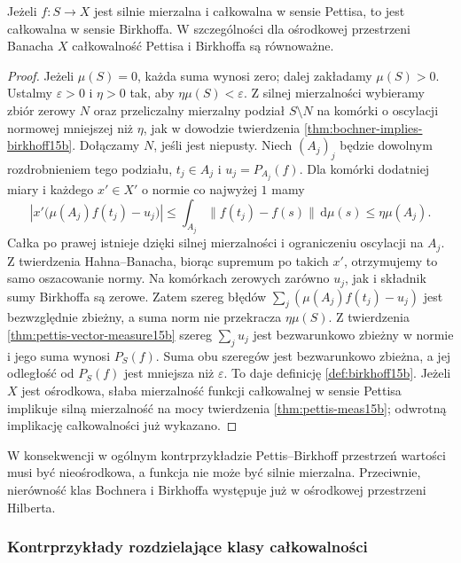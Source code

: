 \begin{wniosek}
\label{cor:birkhoff-strong-pettis15b}
Jeżeli $f:S\to X$ jest silnie mierzalna
i całkowalna w sensie Pettisa, to jest całkowalna
w sensie Birkhoffa. W szczególności dla ośrodkowej
przestrzeni Banacha $X$ całkowalność Pettisa
i Birkhoffa są równoważne.
\end{wniosek}
\begin{proof}
Jeżeli $\mu(S)=0$, każda suma wynosi zero;
dalej zakładamy $\mu(S)>0$. Ustalmy $\varepsilon>0$
i $\eta>0$ tak, aby $\eta\mu(S)<\varepsilon$.
Z silnej mierzalności wybieramy zbiór zerowy $N$
oraz przeliczalny mierzalny podział $S\setminus N$
na komórki o oscylacji normowej mniejszej niż $\eta$,
jak w dowodzie twierdzenia
\ref{thm:bochner-implies-birkhoff15b}.
Dołączamy $N$, jeśli jest niepusty.
Niech $(A_j)_j$ będzie dowolnym rozdrobnieniem
tego podziału, $t_j\in A_j$ i $u_j=P_{A_j}(f)$.
Dla komórki dodatniej miary i każdego $x'\in X'$
o normie co najwyżej $1$ mamy
\[
 \left|x'\bigl(\mu(A_j)f(t_j)-u_j\bigr)\right|
 \le\int_{A_j}\|f(t_j)-f(s)\|\,\mathrm d\mu(s)
 \le\eta\mu(A_j).
\]
Całka po prawej istnieje dzięki silnej mierzalności
i ograniczeniu oscylacji na $A_j$. Z twierdzenia
Hahna--Banacha, biorąc supremum po takich
$x'$, otrzymujemy to samo oszacowanie normy.
Na komórkach zerowych zarówno $u_j$, jak i składnik
sumy Birkhoffa są zerowe. Zatem szereg błędów
$\sum_j(\mu(A_j)f(t_j)-u_j)$ jest bezwzględnie
zbieżny, a suma norm nie przekracza $\eta\mu(S)$.
Z twierdzenia \ref{thm:pettis-vector-measure15b}
szereg $\sum_j u_j$ jest bezwarunkowo zbieżny
w normie i jego suma wynosi $P_S(f)$.
Suma obu szeregów jest bezwarunkowo zbieżna,
a jej odległość od $P_S(f)$ jest mniejsza
niż $\varepsilon$. To daje definicję
\ref{def:birkhoff15b}. Jeżeli $X$ jest ośrodkowa,
słaba mierzalność funkcji całkowalnej w sensie Pettisa
implikuje silną mierzalność na mocy twierdzenia
\ref{thm:pettis-meas15b}; odwrotną implikację
całkowalności już wykazano.
\end{proof}

W konsekwencji w ogólnym kontrprzykładzie
Pettis--Birkhoff przestrzeń wartości musi być
nieośrodkowa, a funkcja nie może być silnie
mierzalna. Przeciwnie, nierówność klas Bochnera
i Birkhoffa występuje już w ośrodkowej
przestrzeni Hilberta.

\subsubsection{Kontrprzykłady rozdzielające klasy całkowalności}

